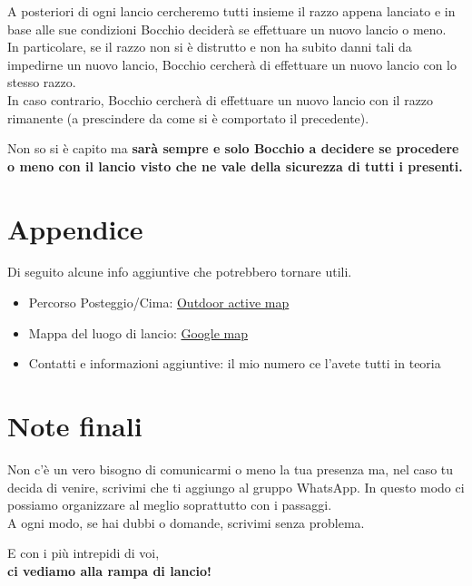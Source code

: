 \documentclass[12pt, a4paper]{article}
\begin{document}
A posteriori di ogni lancio cercheremo tutti insieme il razzo appena lanciato e in base alle sue condizioni Bocchio deciderà se effettuare un nuovo lancio o meno.\\
In particolare, se il razzo non si è distrutto e non ha subito danni tali da impedirne un nuovo lancio, Bocchio cercherà di effettuare un nuovo lancio con lo stesso razzo.\\
In caso contrario, Bocchio cercherà di effettuare un nuovo lancio con il razzo rimanente (a prescindere da come si è comportato il precedente).

Non so si è capito ma \textbf{sarà sempre e solo Bocchio a decidere se procedere o meno con il lancio visto che ne vale della sicurezza di tutti i presenti.}


\section{Appendice}

Di seguito alcune info aggiuntive che potrebbero tornare utili.
\begin{itemize}
    \item Percorso Posteggio/Cima: \href{https://www.outdooractive.com/it/route/escursione/tutti-alla-rampa-di-lancio-/272435157/?share=%7Ezwmiuoob%244ossipro}{Outdoor active map}
    \item Mappa del luogo di lancio: \href{https://www.google.com/maps/d/u/0/edit?mid=1mq_WNJcDX-Hdui0vGDH38mdwduJksQ8&usp=sharing}{Google map}
    \item Contatti e informazioni aggiuntive: il mio numero ce l'avete tutti in teoria
\end{itemize}


\section{Note finali}

Non c'è un vero bisogno di comunicarmi o meno la tua presenza ma, nel caso tu decida di venire, scrivimi che ti aggiungo al gruppo WhatsApp.
In questo modo ci possiamo organizzare al meglio soprattutto con i passaggi.\\
A ogni modo, se hai dubbi o domande, scrivimi senza problema.\\


\begin{center}
    \huge E con i più intrepidi di voi,\\
    \textbf{ci vediamo alla rampa di lancio!}
\end{center}
\end{document}
